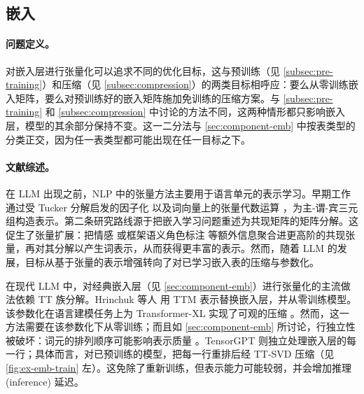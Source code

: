

\subsection{嵌入}
\label{subsec:embeddings}

\paragraph{问题定义。}

对嵌入层进行张量化可以追求不同的优化目标，这与预训练（见 \cref{subsec:pre-training}）和压缩（见 \cref{subsec:compression}）的两类目标相呼应：要么从零训练嵌入矩阵，要么对预训练好的嵌入矩阵施加免训练的压缩方案。与 \cref{subsec:pre-training} 和 \cref{subsec:compression} 中讨论的方法不同，这两种情形都只影响嵌入层，模型的其余部分保持不变。这一二分法与 \cref{sec:component-emb} 中按表类型的分类正交，因为任一表类型都可能出现在任一目标之下。

\paragraph{文献综述。}

在 LLM 出现之前，NLP 中的张量方法主要用于语言单元的表示学习。早期工作通过受 Tucker 分解启发的因子化 \cite{cruys2013svo} 以及词向量上的张量代数运算 \cite{etal2014svotensorspaces}，为主-谓-宾三元组构造表示。第二条研究路线源于把嵌入学习问题重述为共现矩阵的矩阵分解。这促生了张量扩展：把情感 \cite{rahimi2021tenssent} 或框架语义角色标注 \cite{etal2017frame} 等额外信息聚合进更高阶的共现张量，再对其分解以产生词表示，从而获得更丰富的表示。然而，随着 LLM 的发展，目标从基于张量的表示增强转向了对已学习嵌入表的压缩与参数化。

在现代 LLM 中，对经典嵌入层（见 \cref{sec:component-emb}）进行张量化的主流做法依赖 TT 族分解。Hrinchuk 等人 \cite{hrinchuk2020tensorized} 用 TTM 表示替换嵌入层，并从零训练模型。
该参数化在语言建模任务上为 Transformer-XL \cite{dai2019transformerxl} 实现了可观的压缩 \cite{hrinchuk2020tensorized}。然而，这一方法需要在该参数化下从零训练；而且如 \cref{sec:component-emb} 所讨论，行独立性被破坏：词元的排列顺序可能影响表示质量 \cite{hrinchuk2020tensorized}。TensorGPT \cite{xu2023tensorgpt} 则独立处理嵌入层的每一行；具体而言，对已预训练的模型，把每一行重排后经 TT-SVD \cite{oseledets2011tensor} 压缩（见 \cref{fig:ex-emb-train} 左）。这免除了重新训练，但表示能力可能较弱，并会增加推理 (inference) 延迟。


